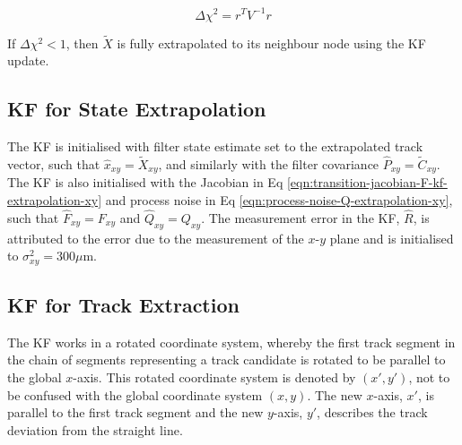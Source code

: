 \begin{equation}
\Delta \chi^{2} = r^{T} {V}^{-1} r
\label{eqn:mahalanobis-distance-trackml-xy}
\end{equation}

If $\Delta \chi^{2} < 1$, then $\tilde{X}$ is fully extrapolated to its neighbour node using the KF update.




\subsection{KF for State Extrapolation}

The KF is initialised with filter state estimate set to the extrapolated track vector, such that $\hat{x}_{xy} = \tilde{X}_{xy}$, and similarly with the filter covariance $\hat{P}_{xy} = \tilde{C}_{xy}$. The KF is also initialised with the Jacobian in Eq \eqref{eqn:transition-jacobian-F-kf-extrapolation-xy} and process noise in Eq \eqref{eqn:process-noise-Q-extrapolation-xy}, such that $\hat{F}_{xy} = F_{xy}$ and $\hat{Q}_{xy} = Q_{xy}$. The measurement error in the KF, $\hat{R}$, is attributed to the error due to the measurement of the $x$-$y$ plane and is initialised to $\sigma_{xy}^{2} = 300\mu$m.










\subsection{KF for Track Extraction}

The KF works in a rotated coordinate system, whereby the first track segment in the chain of segments representing a track candidate is rotated to be parallel to the global $x$-axis. This rotated coordinate system is denoted by $(x', y')$, not to be confused with the global coordinate system $(x, y)$. The new $x$-axis, $x'$, is parallel to the first track segment and the new $y$-axis, $y'$, describes the track deviation from the straight line.

